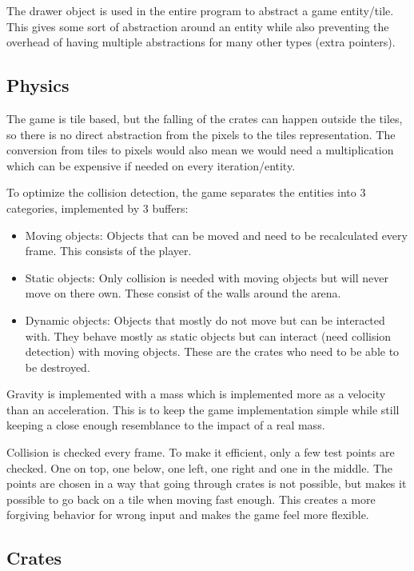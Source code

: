 \documentclass[]{article}
\begin{document}
The drawer object is used in the entire program to abstract a game entity/tile.
This gives some sort of abstraction around an entity while also preventing the
overhead of having multiple abstractions for many other types (extra pointers).

\subsection{Physics}%
\label{sub:physics}

The game is tile based, but the falling of the crates can happen outside the
tiles, so there is no direct abstraction from the pixels to the tiles
representation. The conversion from tiles to pixels would also mean we would
need a multiplication which can be expensive if needed on every
iteration/entity.

To optimize the collision detection, the game separates the entities into 3
categories, implemented by 3 buffers:
\begin{itemize}
    \item Moving objects: Objects that can be moved and need to be recalculated
        every frame. This consists of the player.
    \item Static objects: Only collision is needed with moving objects but will
        never move on there own. These consist of the walls around the arena.
    \item Dynamic objects: Objects that mostly do not move but can be
        interacted with. They behave mostly as static objects but can interact
        (need collision detection) with moving objects. These are the crates
        who need to be able to be destroyed.
\end{itemize}

Gravity is implemented with a mass which is implemented more as a velocity than
an acceleration. This is to keep the game implementation simple while still
keeping a close enough resemblance to the impact of a real mass.

Collision is checked every frame. To make it efficient, only a few test points
are checked. One on top, one below, one left, one right and one in the middle.
The points are chosen in a way that going through crates is not possible, but
makes it possible to go back on a tile when moving fast enough. This creates
a more forgiving behavior for wrong input and makes the game feel more 
flexible.

\subsection{Crates}%
\label{sub:crates}
\end{document}
